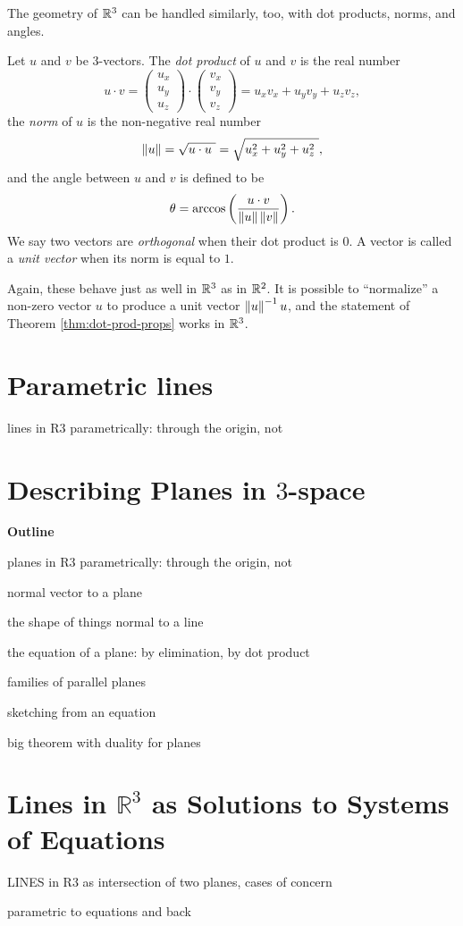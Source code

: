 \documentclass[00-livre-main.tex]{subfiles}
\begin{document}
The geometry of $\mathbb{R}^3$ can be handled similarly, too, with dot products, norms, and angles. 

\begin{definition}
Let $u$ and $v$ be $3$-vectors. The \emph{dot product} of $u$ and $v$ is the real number
\[
u \cdot v = \begin{pmatrix} u_x \\ u_y \\ u_z \end{pmatrix} \cdot \begin{pmatrix} v_x \\ v_y \\ v_z \end{pmatrix} = u_x v_x + u_y v_y + u_z v_z,
\]
the \emph{norm} of $u$ is the non-negative real number
\[
\left\|u\right\| = \sqrt{u\cdot u\ } = \sqrt{ u_x^2 + u_y^2 + u_z^2\ }, 
\]
and the angle between $u$ and $v$ is defined to be 
\[
\theta = \arccos\left( \dfrac{u\cdot v}{\left\|u\right\|\left\|v\right\|} \right). 
\]
We say two vectors are \emph{orthogonal} when their dot product is $0$. A vector is called a \emph{unit vector} when its norm is equal to $1$.
\end{definition}

Again, these behave just as well in $\mathbb{R}^3$ as in $\mathbb{R}^2$. It is possible to ``normalize'' a non-zero vector $u$ to produce a unit vector $\left\|u\right\|^{-1} u$, and the statement of Theorem \ref{thm:dot-prod-props} works in $\mathbb{R}^3$.


\section*{Parametric lines}

lines in R3 parametrically: through the origin, not

\section*{Describing Planes in $3$-space}

\textbf{Outline}
\begin{compactitem}
\item planes in R3 parametrically: through the origin, not
\item normal vector to a plane
\item the shape of things normal to a line
\item the equation of a plane: by elimination, by dot product
\item families of parallel planes
\item sketching from an equation
\item big theorem with duality for planes
\end{compactitem}

\section*{Lines in $\mathbb{R}^3$ as Solutions to Systems of Equations}

LINES in R3 as intersection of two planes, cases of concern

parametric to equations and back
\end{document}
